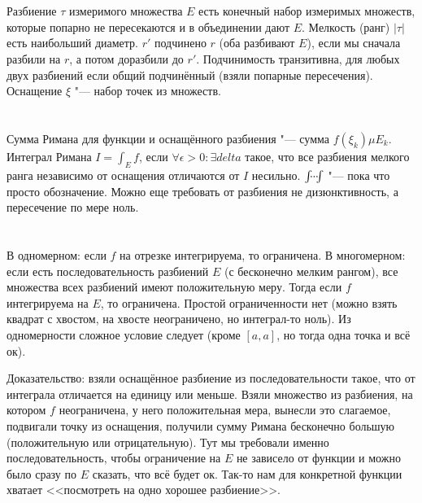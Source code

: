 \section{} %
Разбиение $\tau$ измеримого множества $E$ есть конечный набор измеримых множеств, которые попарно не пересекаются и в объединении дают $E$.
Мелкость (ранг) $|\tau|$ есть наибольший диаметр.
$r'$ подчинено $r$ (оба разбивают $E$), если мы сначала разбили на $r$, а потом доразбили до $r'$.
Подчинимость транзитивна, для любых двух разбиений если общий подчинённый (взяли попарные пересечения).
Оснащение $\xi$ "--- набор точек из множеств.

\section{} %
Сумма Римана для функции и оснащённого разбиения "--- сумма $f(\xi_k)\mu E_k$.
Интеграл Римана $I=\int_E f$, если $\forall \epsilon > 0\colon \exists delta$ такое, что все разбиения мелкого ранга независимо от оснащения отличаются от $I$ несильно.
$\idotsint$ "--- пока что просто обозначение.
Можно еще требовать от разбиения не дизюнктивность, а пересечение по мере ноль.

\section{} %
В одномерном: если $f$ на отрезке интегрируема, то ограничена.
В многомерном: если есть последовательность разбиений $E$ (с бесконечно мелким рангом), все множества всех разбиений имеют положительную меру.
Тогда если $f$ интегрируема на $E$, то ограничена.
Простой ограниченности нет (можно взять квадрат с хвостом, на хвосте неограничено, но интеграл-то ноль).
Из одномерности сложное условие следует (кроме $[a,a]$, но тогда одна точка и всё ок).

Доказательство: взяли оснащённое разбиение из последовательности такое, что от интеграла отличается на единицу или меньше.
Взяли множество из разбиения, на котором $f$ неограничена, у него положительная мера, вынесли это слагаемое, подвигали точку из оснащения, получили сумму Римана бесконечно большую (положительную или отрицательную).
Тут мы требовали именно последовательность, чтобы ограничение на $E$ не зависело от функции и можно было сразу по $E$ сказать, что всё будет ок.
Так-то нам для конкретной функции хватает <<посмотреть на одно хорошее разбиение>>.


